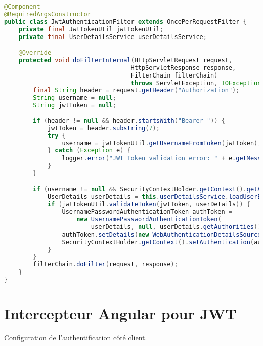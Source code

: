 \documentclass[12pt,a4paper]{report}
\begin{document}
\begin{lstlisting}[language=Java, caption=JwtAuthenticationFilter.java]
@Component
@RequiredArgsConstructor
public class JwtAuthenticationFilter extends OncePerRequestFilter {
    private final JwtTokenUtil jwtTokenUtil;
    private final UserDetailsService userDetailsService;

    @Override
    protected void doFilterInternal(HttpServletRequest request, 
                                   HttpServletResponse response, 
                                   FilterChain filterChain) 
                                   throws ServletException, IOException {
        final String header = request.getHeader("Authorization");
        String username = null;
        String jwtToken = null;
        
        if (header != null && header.startsWith("Bearer ")) {
            jwtToken = header.substring(7);
            try {
                username = jwtTokenUtil.getUsernameFromToken(jwtToken);
            } catch (Exception e) {
                logger.error("JWT Token validation error: " + e.getMessage());
            }
        }

        if (username != null && SecurityContextHolder.getContext().getAuthentication() == null) {
            UserDetails userDetails = this.userDetailsService.loadUserByUsername(username);
            if (jwtTokenUtil.validateToken(jwtToken, userDetails)) {
                UsernamePasswordAuthenticationToken authToken = 
                    new UsernamePasswordAuthenticationToken(
                        userDetails, null, userDetails.getAuthorities());
                authToken.setDetails(new WebAuthenticationDetailsSource().buildDetails(request));
                SecurityContextHolder.getContext().setAuthentication(authToken);
            }
        }
        filterChain.doFilter(request, response);
    }
}
\end{lstlisting}

\section{Intercepteur Angular pour JWT}
Configuration de l'authentification côté client.
\end{document}
